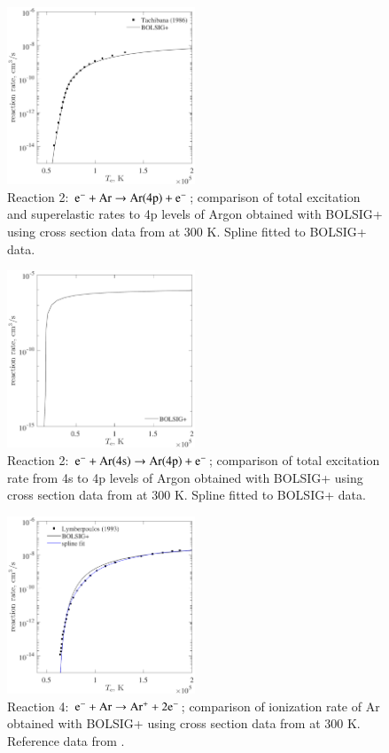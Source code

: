 \documentclass{warpdoc}
\begin{document}
\begin{figure}[ht]
     \centering
     \includegraphics[width=0.5\textwidth]{figs/reaction2.pdf}
     \caption{Reaction 2: $\rm e^- + Ar \rightarrow Ar(4p) + e^-$; comparison of total excitation and superelastic rates to 4p levels of Argon obtained with BOLSIG+ using cross section data from \cite{pr:tachibana:1986} at 300 K. Spline fitted to BOLSIG+ data.}
     \label{fig:rate_R2}
\end{figure}

\begin{figure}[ht]
     \centering
     \includegraphics[width=0.5\textwidth]{figs/reaction3.pdf}
     \caption{Reaction 2: $\rm e^- + Ar(4s) \rightarrow Ar(4p) + e^-$; comparison of total excitation rate from 4s to 4p levels of Argon obtained with BOLSIG+ using cross section data from \cite{pr:2014:zatsarinny} at 300 K. Spline fitted to BOLSIG+ data.}
     \label{fig:rate_R3}
\end{figure}

\begin{figure}[ht]
     \centering
     \includegraphics[width=0.5\textwidth]{figs/reaction4.pdf}
     \caption{Reaction 4: $\rm e^- + Ar \rightarrow Ar^+ + 2e^-$; comparison of ionization rate of Ar obtained with BOLSIG+ using cross section data from \cite{jcp:1965:rapp} at 300 K. Reference data from \cite{jap:1993:lymberopoulos, pop:2012:adams}.}
     \label{fig:rate_R4}
\end{figure}
\end{document}
